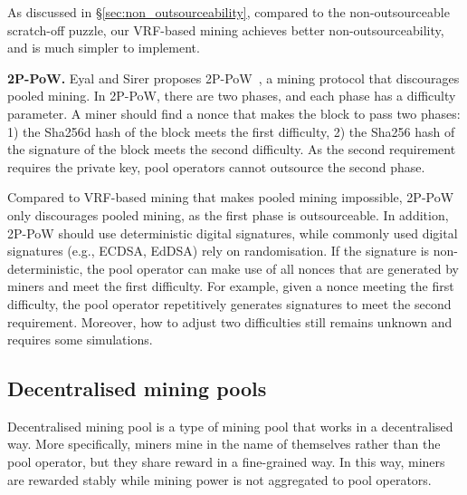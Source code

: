 As discussed in \S\ref{sec:non_outsourceability}, compared to the non-outsourceable scratch-off puzzle, our VRF-based mining achieves better non-outsourceability, and is much simpler to implement.

\textbf{2P-PoW.}
Eyal and Sirer proposes 2P-PoW~\cite{2P-PoW}, a mining protocol that discourages pooled mining.
In 2P-PoW, there are two phases, and each phase has a difficulty parameter.
A miner should find a nonce that makes the block to pass two phases: 1) the Sha256d hash of the block meets the first difficulty, 2) the Sha256 hash of the signature of the block meets the second difficulty.
As the second requirement requires the private key, pool operators cannot outsource the second phase.

Compared to VRF-based mining that makes pooled mining impossible, 2P-PoW only discourages pooled mining, as the first phase is outsourceable.
In addition, 2P-PoW should use deterministic digital signatures, while commonly used digital signatures (e.g., ECDSA, EdDSA) rely on randomisation.
If the signature is non-deterministic, the pool operator can make use of all nonces that are generated by miners and meet the first difficulty.
For example, given a nonce meeting the first difficulty, the pool operator repetitively generates signatures to meet the second requirement.
Moreover, how to adjust two difficulties still remains unknown and requires some simulations.




\subsection{Decentralised mining pools}



Decentralised mining pool is a type of mining pool that works in a decentralised way.
More specifically, miners mine in the name of themselves rather than the pool operator, but they share reward in a fine-grained way.
In this way, miners are rewarded stably while mining power is not aggregated to pool operators.



